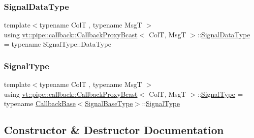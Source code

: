\subsubsection{\texorpdfstring{Signal\+Data\+Type}{SignalDataType}}
{\footnotesize\ttfamily template$<$typename ColT , typename MsgT $>$ \\
using \hyperlink{structvt_1_1pipe_1_1callback_1_1_callback_proxy_bcast}{vt\+::pipe\+::callback\+::\+Callback\+Proxy\+Bcast}$<$ ColT, MsgT $>$\+::\hyperlink{structvt_1_1pipe_1_1callback_1_1_callback_proxy_bcast_ae26574a2b9198a4b4e427bbaab76de53}{Signal\+Data\+Type} =  typename Signal\+Type\+::\+Data\+Type}

\mbox{\label{structvt_1_1pipe_1_1callback_1_1_callback_proxy_bcast_a152bf72e620b884defce792be43860d2}} 
\subsubsection{\texorpdfstring{Signal\+Type}{SignalType}}
{\footnotesize\ttfamily template$<$typename ColT , typename MsgT $>$ \\
using \hyperlink{structvt_1_1pipe_1_1callback_1_1_callback_proxy_bcast}{vt\+::pipe\+::callback\+::\+Callback\+Proxy\+Bcast}$<$ ColT, MsgT $>$\+::\hyperlink{structvt_1_1pipe_1_1callback_1_1_callback_proxy_bcast_a152bf72e620b884defce792be43860d2}{Signal\+Type} =  typename \hyperlink{structvt_1_1pipe_1_1callback_1_1_callback_base}{Callback\+Base}$<$\hyperlink{structvt_1_1pipe_1_1callback_1_1_callback_proxy_bcast_a4ed994346a98d36d5d70c07a3d1e1dfb}{Signal\+Base\+Type}$>$\+::\hyperlink{structvt_1_1pipe_1_1callback_1_1_callback_proxy_bcast_a152bf72e620b884defce792be43860d2}{Signal\+Type}}



\subsection{Constructor \& Destructor Documentation}
\mbox{\label{structvt_1_1pipe_1_1callback_1_1_callback_proxy_bcast_a0f65df639ce4c3a9760b50107defbcad}} 
